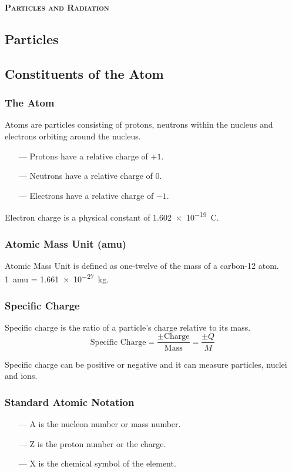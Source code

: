 \documentclass[10pt]{article}
\begin{document}
\LARGE \textbf{{\textsc{Particles and Radiation}}} \hrulefill
\begin{multicols}{2}
	\normalsize
	\section{Particles}
	\subsection{Constituents of the Atom}

	\subsubsection{The Atom}
	\begin{center}
	\end{center}
	Atoms are particles consisting of protons, neutrons within the nucleus and
	electrons orbiting around the nucleus.
	\medskip
	\begin{itemize}
		\item[---] Protons have a relative charge of $+1$.
		\item[---] Neutrons have a relative charge of $0$.
		\item[---] Electrons have a relative charge of $-1$.
	\end{itemize}
	\medskip
	Electron charge is a physical constant of \qty{1.602e-19}{\coulomb}.

	\subsubsection{Atomic Mass Unit (amu)}
	Atomic Mass Unit is defined as one-twelve of the mass of a
	carbon-12 atom. \qty{1}{amu} = \qty{1.661e-27}{\kilo\gram}.

	\subsubsection{Specific Charge}
	Specific charge is the ratio of a particle's charge relative to its mass.
	\begin{equation}
		\text{Specific Charge} = \dfrac{\pm \text{Charge}}{\text{Mass}} = \dfrac{\pm Q}{M}
	\end{equation}

	Specific charge can be positive or negative and it can measure particles, nuclei
	and ions.

	\subsubsection{Standard Atomic Notation}
	\begin{center}
	\end{center}
	\begin{itemize}
		\item[---] A is the nucleon number or mass number.
		\item[---] Z is the proton number or the charge.
		\item[---] X is the chemical symbol of the element.
	\end{itemize}


\end{multicols}
\end{document}
